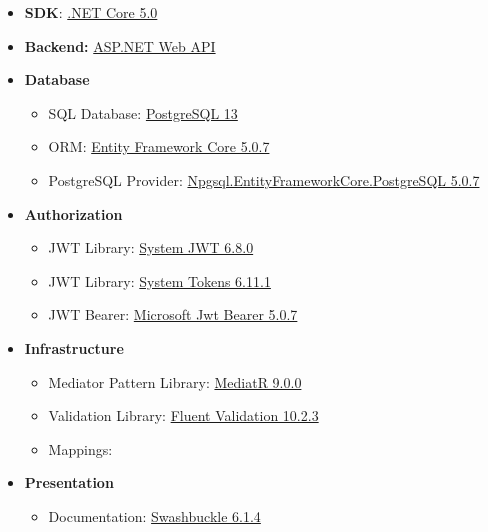 \begin{itemize}
    \item \textbf{SDK}: \href{https://dotnet.microsoft.com/download/dotnet/5.0}{.NET Core 5.0}
    \item \textbf{Backend:} \href{https://dotnet.microsoft.com/apps/aspnet}{ASP.NET Web API}
    \item \textbf{Database}
    \begin{itemize}
        \item SQL Database: \href{https://www.postgresql.org/}{PostgreSQL 13}
        \item ORM: \href{https://www.nuget.org/packages/Microsoft.EntityFrameworkCore/5.0.7?_src=template}{Entity Framework Core 5.0.7}
        \item PostgreSQL Provider: \href{https://www.nuget.org/packages/Npgsql.EntityFrameworkCore.PostgreSQL/5.0.7?_src=template}{Npgsql.EntityFrameworkCore.PostgreSQL 5.0.7}
    \end{itemize}
    \item \textbf{Authorization}
    \begin{itemize}
        \item JWT Library: \href{https://www.nuget.org/packages/System.IdentityModel.Tokens.Jwt}{System JWT 6.8.0}
        \item JWT Library: \href{https://www.nuget.org/packages/System.IdentityModel.Tokens}{System Tokens 6.11.1}
        \item JWT Bearer: \href{https://www.nuget.org/packages/Microsoft.AspNetCore.Authentication.JwtBearer/5.0.7?_src=template}{Microsoft Jwt Bearer 5.0.7}
    \end{itemize}
    \item \textbf{Infrastructure}
    \begin{itemize}
        \item Mediator Pattern Library: \href{https://www.nuget.org/packages/MediatR/9.0.0?_src=template}{MediatR 9.0.0}
        \item Validation Library: \href{https://www.nuget.org/packages/FluentValidation/10.2.3?_src=template}{Fluent Validation 10.2.3}
        \item Mappings:
    \end{itemize}
    \item \textbf{Presentation}
    \begin{itemize}
        \item Documentation: \href{https://www.nuget.org/packages/Swashbuckle.AspNetCore/5.6.3?_src=template}{Swashbuckle 6.1.4}

\end{itemize}
\end{itemize}
